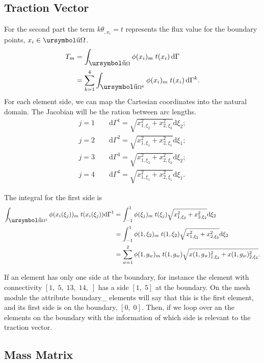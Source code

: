 \documentclass[10pt, a4paper]{article}
\def\urpartial{\mbox{\ursymbol\char"B6}}
\begin{document}
\subsection{Traction Vector}


For the second part the term $k \theta_{,x_i} = t$ represents the flux value for the boundary points,  $x_i \in \urpartial \Omega$.
\begin{align*}
T_m &= \int_{\urpartial \Omega} \phi(x_i)_m \; t(x_i) \, \mathrm{d}\Gamma\\
	&= \sum_{k=1}^4 \int_{\urpartial \Omega^k} \phi(x_i)_m \; t(x_i) \, \mathrm{d}\Gamma^k.
\end{align*}
For each element side, we can map the Cartesian coordinates into the natural domain. The Jacobian will be the ration between arc lengths.
\begin{align*}
j=1 \qquad \mathrm{d} \Gamma^1 = \sqrt{x_{1,\xi_2}^2 + x_{2,\xi_2}^2} \mathrm{d}\xi_2 ;\\
j=2 \qquad \mathrm{d} \Gamma^2 = \sqrt{x_{1,\xi_1}^2 + x_{2,\xi_1}^2} \mathrm{d}\xi_1; \\
j=3 \qquad \mathrm{d} \Gamma^3 = \sqrt{x_{1,\xi_2}^2 + x_{2,\xi_2}^2} \mathrm{d}\xi_2 ;\\
j=4 \qquad \mathrm{d} \Gamma^4 = \sqrt{x_{1,\xi_1}^2 + x_{2,\xi_1}^2} \mathrm{d}\xi_1.
\end{align*}

The integral for the first side is
\begin{align*}
\int_{\urpartial \Omega^1} \phi(x_i(\xi_j))_m \; t(x_i(\xi_j)) \mathrm{d} \Gamma^1 &= \int_{-1}^1 \phi(\xi_j)_m \; t(\xi_j) \sqrt{x_{1,\xi_2}^2 + x_{2,\xi_2}^2} \mathrm{d}\xi_2 \\
&=  \int_{-1}^1 \phi(1, \xi_2)_m\; t(1, \xi_2)   \sqrt{x_{1,\xi_2}^2 + x_{2,\xi_2}^2} \mathrm{d}\xi_2 \\
&=  \sum_{w=1}^2 \phi(1, g_w)_m \; t(1, g_w) \sqrt{x(1, g_w)_{1,\xi_2}^2 + x(1, g_w)_{2,\xi_2}^2}.
\end{align*}

If an element has only one side at the boundary, for instance the element with connectivity $[1, \;5, \; 13, \; 14, \;]$ has a side $[1, \; 5]$ at the boundary. On the mesh module the attribute \textsf{boundary\_ elements} will say that this is the first element, and its first side is on the boundary, $[0, \;0]$.  Then, if we loop over an the elements on the boundary with the information of which side is relevant to the traction vector.


\subsection{Mass Matrix}
\end{document}
